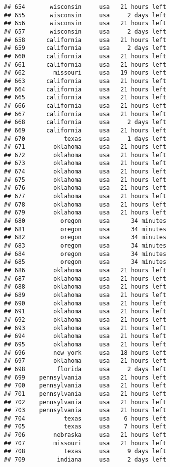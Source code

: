 \documentclass[
]{article}
\begin{document}
\begin{verbatim}
## 654       wisconsin     usa   21 hours left
## 655       wisconsin     usa     2 days left
## 656       wisconsin     usa   21 hours left
## 657       wisconsin     usa     2 days left
## 658      california     usa   21 hours left
## 659      california     usa     2 days left
## 660      california     usa   21 hours left
## 661      california     usa   21 hours left
## 662        missouri     usa   19 hours left
## 663      california     usa   21 hours left
## 664      california     usa   21 hours left
## 665      california     usa   21 hours left
## 666      california     usa   21 hours left
## 667      california     usa   21 hours left
## 668      california     usa     2 days left
## 669      california     usa   21 hours left
## 670           texas     usa     1 days left
## 671        oklahoma     usa   21 hours left
## 672        oklahoma     usa   21 hours left
## 673        oklahoma     usa   21 hours left
## 674        oklahoma     usa   21 hours left
## 675        oklahoma     usa   21 hours left
## 676        oklahoma     usa   21 hours left
## 677        oklahoma     usa   21 hours left
## 678        oklahoma     usa   21 hours left
## 679        oklahoma     usa   21 hours left
## 680          oregon     usa      34 minutes
## 681          oregon     usa      34 minutes
## 682          oregon     usa      34 minutes
## 683          oregon     usa      34 minutes
## 684          oregon     usa      34 minutes
## 685          oregon     usa      34 minutes
## 686        oklahoma     usa   21 hours left
## 687        oklahoma     usa   21 hours left
## 688        oklahoma     usa   21 hours left
## 689        oklahoma     usa   21 hours left
## 690        oklahoma     usa   21 hours left
## 691        oklahoma     usa   21 hours left
## 692        oklahoma     usa   21 hours left
## 693        oklahoma     usa   21 hours left
## 694        oklahoma     usa   21 hours left
## 695        oklahoma     usa   21 hours left
## 696        new york     usa   18 hours left
## 697        oklahoma     usa   21 hours left
## 698         florida     usa     2 days left
## 699    pennsylvania     usa   21 hours left
## 700    pennsylvania     usa   21 hours left
## 701    pennsylvania     usa   21 hours left
## 702    pennsylvania     usa   21 hours left
## 703    pennsylvania     usa   21 hours left
## 704           texas     usa    6 hours left
## 705           texas     usa    7 hours left
## 706        nebraska     usa   21 hours left
## 707        missouri     usa   21 hours left
## 708           texas     usa     9 days left
## 709         indiana     usa     2 days left

\end{verbatim}
\end{document}
